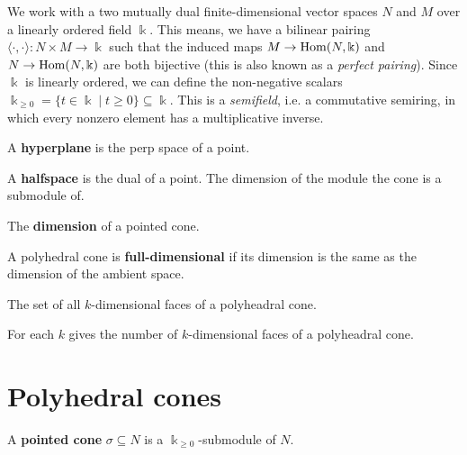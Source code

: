 
We work with a two mutually dual finite-dimensional vector spaces \( N
\) and \( M \) over a linearly ordered field \( \Bbbk \). This means,
we have a bilinear pairing \( \langle \cdot, \cdot \rangle \colon N
\times M \to \Bbbk \) such that the induced maps \( M \to
\operatorname{Hom}(N,\Bbbk) \) and \( N \to \operatorname{Hom}(N,\Bbbk) \) are both bijective
(this is also known as a \emph{perfect pairing}). Since \( \Bbbk \) is
linearly ordered, we can define the non-negative scalars \(\Bbbk_{\geq
0} = \{t \in \Bbbk \mid t \geq 0 \} \subseteq \Bbbk\). This is a
\emph{semifield}, i.e. a commutative semiring, in which every nonzero
element has a multiplicative inverse.




\begin{definition}
  \label{names}
  A {\bf hyperplane} is the perp space of a point.

  A {\bf halfspace} is the dual of a point.
  The dimension of the module the cone is a submodule of.

  The {\bf dimension} of a pointed cone.

  A polyhedral cone is {\bf full-dimensional} if its dimension is the same as the dimension of the ambient space.

  The set of all \(k\)-dimensional faces of a polyheadral cone.

  For each \(k\) gives the number of \(k\)-dimensional faces of a polyheadral cone.
\end{definition}


\section{Polyhedral cones}

\begin{definition}
  \label{pointed-cone}
  \uses{}
  A {\bf pointed cone} \( \sigma \subseteq N \) is a \( \Bbbk_{\geq 0}
  \)-submodule of \( N \).
\end{definition}

